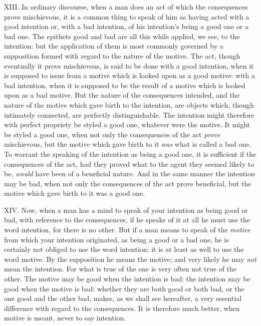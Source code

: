 \documentclass[12pt]{report}
\begin{document}
XIII. In ordinary discourse, when a man does an act of which the
consequences prove mischievous, it is a common thing to speak of him as
having acted with a good intention or, with a bad intention, of his
intention's being a good one or a bad one. The epithets good and bad are
all this while applied, we see, to the intention: but the application of
them is most commonly governed by a supposition formed with regard to
the nature of the motive. The act, though eventually it prove
mischievous, is said to be done with a good intention, when it is
supposed to issue from a motive which is looked upon as a good motive:
with a bad intention, when it is supposed to be the result of a motive
which is looked upon as a bad motive. But the nature of the consequences
intended, and the nature of the motive which gave birth to the
intention, are objects which, though intimately connected, are perfectly
distinguishable. The intention might therefore with perfect propriety be
styled a good one, whatever were the motive. It might be styled a good
one, when not only the consequences of the act \emph{prove} mischievous,
but the motive which gave birth to it \emph{was} what is called a bad
one. To warrant the speaking of the intention as being a good one, it is
sufficient if the consequences of the act, had they proved what to the
agent they seemed likely to be, \emph{would} have been of a beneficial
nature. And in the same manner the intention may be bad, when not only
the consequences of the act prove beneficial, but the motive which gave
birth to it was a good one.

XIV. Now, when a man has a mind to speak of your intention as being good
or bad, with reference to the consequences, if he speaks of it at all he
must use the word intention, for there is no other. But if a man means
to speak of the \emph{motive} from which your intention originated, as
being a good or a bad one, he is certainly not obliged to use the word
intention: it is at least as well to use the word motive. By the
supposition he means the motive; and very likely he may \emph{not} mean
the intention. For what is true of the one is very often not true of the
other. The motive may be good when the intention is bad: the intention
may be good when the motive is bad: whether they are both good or both
bad, or the one good and the other bad, makes, as we shall see
hereafter, a very essential difference with regard to the consequences.
It is therefore much better, when motive is meant, never to say
intention.
\end{document}
